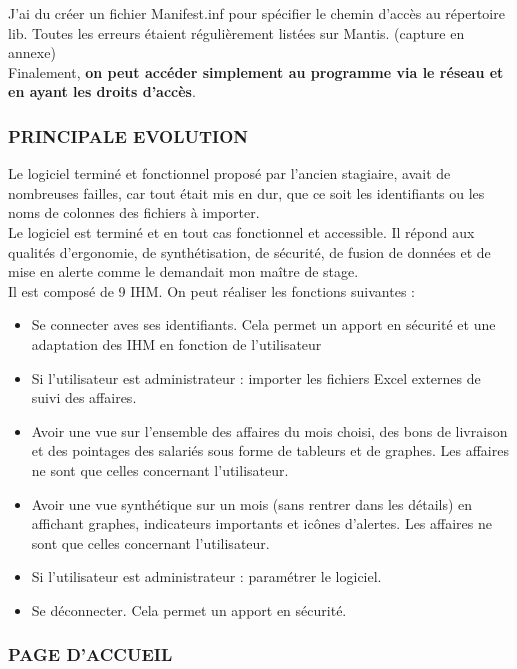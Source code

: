 J’ai du créer un fichier Manifest.inf pour spécifier le chemin d’accès au répertoire lib. Toutes les erreurs étaient régulièrement listées sur Mantis. (capture en annexe) \\

Finalement, \textbf{on peut accéder simplement au programme via le réseau et en ayant les droits d’accès}.

\subsubsection{PRINCIPALE EVOLUTION}

Le logiciel terminé et fonctionnel proposé par l’ancien stagiaire, avait de nombreuses failles, car tout était mis en dur, que ce soit les identifiants ou les noms de colonnes des fichiers à importer. \\

Le logiciel est terminé et en tout cas fonctionnel et accessible. Il répond aux qualités d’ergonomie, de synthétisation, de sécurité, de fusion de données et de mise en alerte comme le demandait mon maître de stage.\\

Il est composé de 9 IHM.  On peut réaliser les fonctions suivantes :
\begin{itemize}
\item Se connecter aves ses identifiants. Cela permet un apport en sécurité et une adaptation des IHM en fonction de l’utilisateur
\item Si l’utilisateur est administrateur : importer les fichiers Excel externes de suivi des affaires.
\item Avoir une vue sur l’ensemble des affaires du mois choisi, des bons de livraison et des pointages des salariés sous forme de tableurs et de graphes. Les affaires ne sont que celles concernant l’utilisateur.
\item Avoir une vue synthétique sur un mois (sans rentrer dans les détails) en affichant graphes, indicateurs importants et icônes d’alertes. Les affaires ne sont que celles concernant l’utilisateur.
\item Si l’utilisateur est administrateur : paramétrer le logiciel.
\item Se déconnecter. Cela permet un apport en sécurité.
\end{itemize}



\subsubsection{PAGE D'ACCUEIL}

